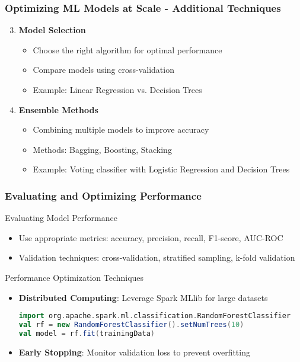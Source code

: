 \documentclass[aspectratio=169]{beamer}
\begin{document}
\begin{frame}[fragile]
    \frametitle{Optimizing ML Models at Scale - Additional Techniques}
    \begin{enumerate}
        \setcounter{enumi}{2} %
        
        \item \textbf{Model Selection}
            \begin{itemize}
                \item Choose the right algorithm for optimal performance
                \item Compare models using cross-validation
                \item Example: Linear Regression vs. Decision Trees
            \end{itemize}
        
        \item \textbf{Ensemble Methods}
            \begin{itemize}
                \item Combining multiple models to improve accuracy
                \item Methods: Bagging, Boosting, Stacking
                \item Example: Voting classifier with Logistic Regression and Decision Trees
            \end{itemize}
    \end{enumerate}
\end{frame}

\begin{frame}[fragile]
    \frametitle{Evaluating and Optimizing Performance}
    \begin{block}{Evaluating Model Performance}
        \begin{itemize}
            \item Use appropriate metrics: accuracy, precision, recall, F1-score, AUC-ROC
            \item Validation techniques: cross-validation, stratified sampling, k-fold validation
        \end{itemize}
    \end{block}

    \begin{block}{Performance Optimization Techniques}
        \begin{itemize}
            \item \textbf{Distributed Computing}: Leverage Spark MLlib for large datasets
            \begin{lstlisting}[language=Scala]
import org.apache.spark.ml.classification.RandomForestClassifier
val rf = new RandomForestClassifier().setNumTrees(10)
val model = rf.fit(trainingData)
            \end{lstlisting}
            \item \textbf{Early Stopping}: Monitor validation loss to prevent overfitting
        \end{itemize}
    \end{block}
\end{frame}
\end{document}
